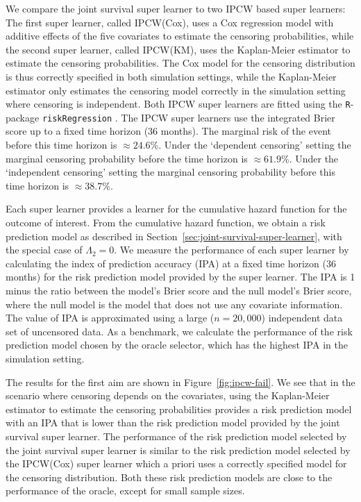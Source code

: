 \documentclass[a4paper,danish]{article}
\newcommand{\1}{\mathds{1}}
\theoremstyle{plain} %
\numberwithin{theorem}{section}
\theoremstyle{definition} %
\theoremstyle{remark}
\begin{document}
We compare the joint survival super learner to two IPCW based super
learners: The first super learner, called IPCW(Cox), uses a Cox
regression model with additive effects of the five covariates to
estimate the censoring probabilities, while the second super learner,
called IPCW(KM), uses the Kaplan-Meier estimator to estimate the
censoring probabilities. The Cox model for the censoring distribution
is thus correctly specified in both simulation settings, while the
Kaplan-Meier estimator only estimates the censoring model correctly in
the simulation setting where censoring is independent. Both IPCW super
learners are fitted using the \texttt{R}-package
\texttt{riskRegression} \citep{Gerds_Ohlendorff_Ozenne_2023}.
%
%
The IPCW super learners use the integrated Brier score up to a fixed time
horizon (36 months). The marginal risk of the event before this time horizon is
\(\approx 24.6\)\%. Under the `dependent censoring' setting the marginal
censoring probability before the time horizon is \(\approx 61.9\)\%. Under the
`independent censoring' setting the marginal censoring probability before this
time horizon is \( \approx 38.7 \)\%.

Each super learner provides a learner for the cumulative hazard
function for the outcome of interest. From the cumulative hazard
function, we obtain a risk prediction model as described in
Section~\ref{sec:joint-survival-super-learner}, with the special case
of $\Lambda_2 = 0$. We measure the performance of each super learner
by calculating the index of prediction accuracy (IPA)
\citep{kattan2018index} at a fixed time horizon (36 months) for the
risk prediction model provided by the super learner. The IPA is 1
minus the ratio between the model's Brier score and the null model's
Brier score, where the null model is the model that does not use any
covariate information. The value of IPA is approximated using a large
(\( n = 20,000 \)) independent data set of uncensored data. As a
benchmark, we calculate the performance of the risk prediction model
chosen by the oracle selector, which has the highest IPA in the
simulation setting.

The results for the first aim are shown in
Figure~\ref{fig:ipcw-fail}. We see that in the scenario where
censoring depends on the covariates, using the Kaplan-Meier estimator
to estimate the censoring probabilities provides a risk prediction
model with an IPA that is lower than the risk prediction model
provided by the joint survival super learner. The performance of the
risk prediction model selected by the joint survival super learner is
similar to the risk prediction model selected by the IPCW(Cox) super
learner which a priori uses a correctly specified model for the
censoring distribution. Both these risk prediction models are close to
the performance of the oracle, except for small sample sizes.
\end{document}
